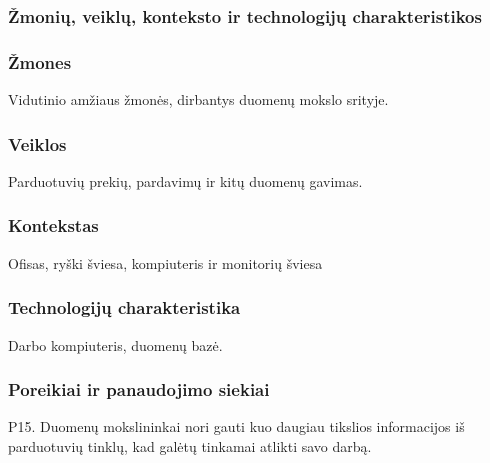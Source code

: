 \documentclass{article}
\begin{document}
\subsubsection{Žmonių, veiklų, konteksto ir technologijų charakteristikos}
\subsubsection*{Žmones}
	Vidutinio amžiaus žmonės, dirbantys duomenų mokslo srityje.
\subsubsection*{Veiklos}
	Parduotuvių prekių, pardavimų ir kitų duomenų gavimas.
\subsubsection*{Kontekstas}
	Ofisas, ryški šviesa, kompiuteris ir monitorių šviesa
\subsubsection*{Technologijų charakteristika}	
	Darbo kompiuteris, duomenų bazė.
\subsubsection{Poreikiai ir panaudojimo siekiai}
	P15. Duomenų mokslininkai nori gauti kuo daugiau tikslios informacijos iš parduotuvių tinklų, kad galėtų tinkamai atlikti savo darbą.
	\pagebreak

\end{document}
